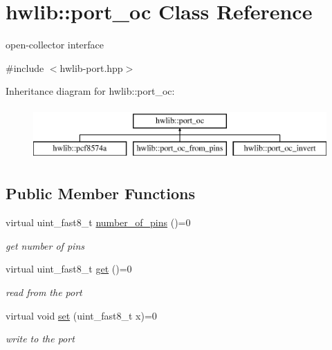\hypertarget{classhwlib_1_1port__oc}{}\section{hwlib\+:\+:port\+\_\+oc Class Reference}
\label{classhwlib_1_1port__oc}


open-\/collector interface  




{\ttfamily \#include $<$hwlib-\/port.\+hpp$>$}

Inheritance diagram for hwlib\+:\+:port\+\_\+oc\+:\begin{figure}[H]
\begin{center}
\leavevmode
\includegraphics[height=2.000000cm]{classhwlib_1_1port__oc}
\end{center}
\end{figure}
\subsection*{Public Member Functions}
\begin{DoxyCompactItemize}
\item 
virtual uint\+\_\+fast8\+\_\+t \hyperlink{classhwlib_1_1port__oc_a44d0dbfde290ad17237ad70c09a4c402}{number\+\_\+of\+\_\+pins} ()=0
\begin{DoxyCompactList}\small\item\em get number of pins \end{DoxyCompactList}\item 
virtual uint\+\_\+fast8\+\_\+t \hyperlink{classhwlib_1_1port__oc_a49f8413dcdc6d9a172c2d9669a2e906e}{get} ()=0
\begin{DoxyCompactList}\small\item\em read from the port \end{DoxyCompactList}\item 
virtual void \hyperlink{classhwlib_1_1port__oc_aefb3d093331e5a87cf2dbe8226dc94ef}{set} (uint\+\_\+fast8\+\_\+t x)=0
\begin{DoxyCompactList}\small\item\em write to the port \end{DoxyCompactList}\end{DoxyCompactItemize}


